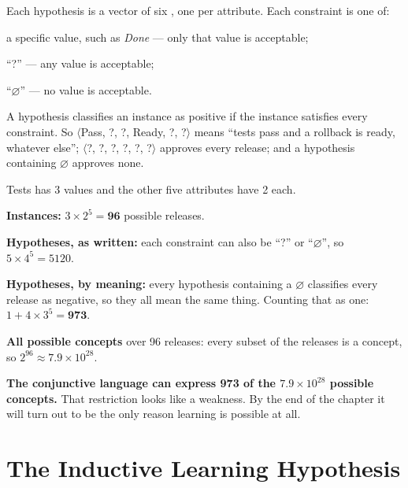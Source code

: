 \begin{definitionbox}
Each hypothesis is a vector of six , one per attribute. Each
constraint is one of:
\begin{tight}
  \item a specific value, such as \emph{Done} --- only that value is acceptable;
  \item ``?'' --- any value is acceptable;
  \item ``$\varnothing$'' --- no value is acceptable.
\end{tight}
A hypothesis classifies an instance as positive if the instance satisfies every
constraint. So $\langle$Pass, ?, ?, Ready, ?, ?$\rangle$ means ``tests pass and a
rollback is ready, whatever else''; $\langle$?, ?, ?, ?, ?, ?$\rangle$ approves
every release; and a hypothesis containing $\varnothing$ approves none.
\end{definitionbox}

\begin{worked}
Tests has 3 values and the other five attributes have 2 each.
\begin{tight}
  \item \textbf{Instances:} $3 \times 2^5 = \mathbf{96}$ possible releases.
  \item \textbf{Hypotheses, as written:} each constraint can also be ``?'' or
        ``$\varnothing$'', so $5 \times 4^5 = 5120$.
  \item \textbf{Hypotheses, by meaning:} every hypothesis containing a
        $\varnothing$ classifies every release as negative, so they all mean the
        same thing. Counting that as one: $1 + 4 \times 3^5 = \mathbf{973}$.
  \item \textbf{All possible concepts} over 96 releases: every subset of the
        releases is a concept, so $2^{96} \approx 7.9 \times 10^{28}$.
\end{tight}
\smallskip
\textbf{The conjunctive language can express 973 of the $7.9 \times 10^{28}$
possible concepts.} That restriction looks like a weakness. By the end of the
chapter it will turn out to be the only reason learning is possible at all.
\end{worked}

\section{The Inductive Learning Hypothesis}

